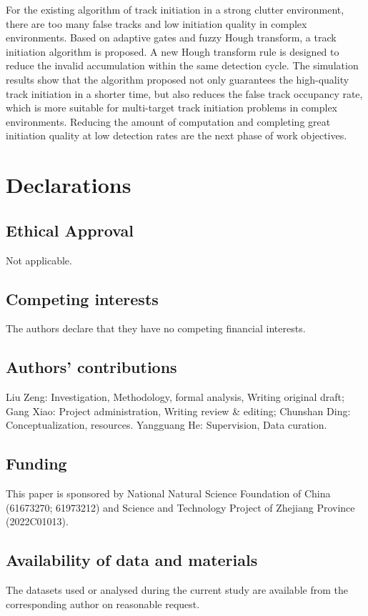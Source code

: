 \documentclass[default,iicol]{sn-jnl}%
\theoremstyle{thmstyleone}%
\theoremstyle{thmstyletwo}%
\theoremstyle{thmstylethree}%
\begin{document}
For the existing algorithm of track initiation in a strong clutter environment, there are too many false tracks and low initiation quality in complex environments. Based on adaptive gates and fuzzy Hough transform, a track initiation algorithm is proposed. A new Hough transform rule is designed to reduce the invalid accumulation within the same detection cycle. The simulation results show that the algorithm proposed not only guarantees the high-quality track initiation in a shorter time, but also reduces the false track occupancy rate, which is more suitable for multi-target track initiation problems in complex environments. Reducing the amount of computation and completing great initiation quality at low detection rates are the next phase of work objectives.

\section*{Declarations}

\subsection*{Ethical Approval}
Not applicable.

\subsection*{Competing interests}
The authors declare that they have no competing financial interests.

\subsection*{Authors' contributions}
Liu Zeng: Investigation, Methodology, formal analysis, Writing original draft; Gang Xiao: Project administration, Writing review \& editing; Chunshan Ding: Conceptualization, resources. Yangguang He: Supervision, Data curation.

\subsection*{Funding}
This paper is sponsored by National Natural Science Foundation of China (61673270; 61973212) and Science and Technology Project of Zhejiang Province (2022C01013).

\subsection*{Availability of data and materials}
The datasets used or analysed during the current study are available from the corresponding author on reasonable request.





\end{document}
